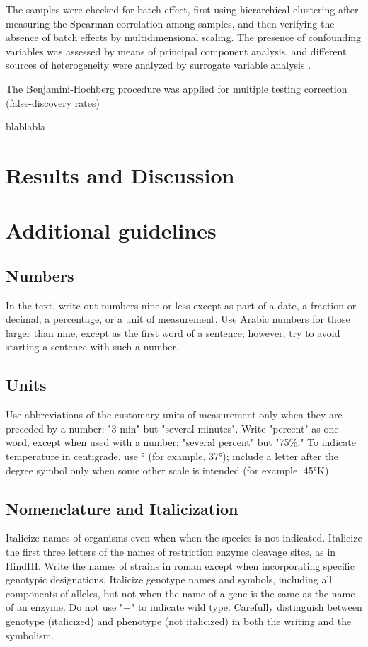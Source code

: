 \documentclass[9pt,twocolumn,twoside]{gsajnl}
\begin{document}
The samples were checked for batch effect, first using hierarchical clustering after measuring the Spearman correlation among samples, and then verifying the absence of batch effects by multidimensional scaling. The presence of confounding variables was assessed by means of principal component analysis, and different sources of heterogeneity were analyzed by surrogate variable analysis \citep{Leek2007}.

The Benjamini-Hochberg procedure was applied for multiple testing correction (false-discovery rates) \citep{Benjamini1995}

blablabla

\section*{Results and Discussion}


\section*{Additional guidelines}

\subsection*{Numbers} In the text, write out numbers nine or less except as part of a date, a fraction or decimal, a percentage, or a unit of measurement. Use Arabic numbers for those larger than nine, except as the first word of a sentence; however, try to avoid starting a sentence with such a number.

\subsection*{Units} Use abbreviations of the customary units of measurement only when they are preceded by a number: "3 min" but "several minutes". Write "percent" as one word, except when used with a number: "several percent" but "75\%." To indicate temperature in centigrade, use ° (for example, 37°); include a letter after the degree symbol only when some other scale is intended (for example, 45°K).

\subsection*{Nomenclature and Italicization} Italicize names of organisms even when  when the species is not indicated.  Italicize the first three letters of the names of restriction enzyme cleavage sites, as in HindIII. Write the names of strains in roman except when incorporating specific genotypic designations. Italicize genotype names and symbols, including all components of alleles, but not when the name of a gene is the same as the name of an enzyme. Do not use "+" to indicate wild type. Carefully distinguish between genotype (italicized) and phenotype (not italicized) in both the writing and the symbolism.
\end{document}
